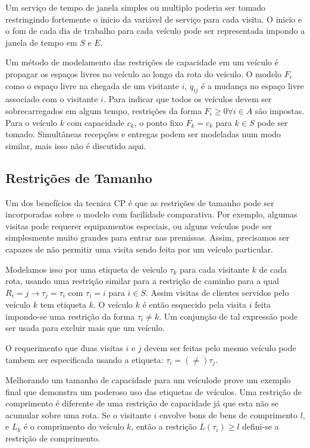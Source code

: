 \documentclass[a4paper, 12pt]{article}
\begin{document}
 Um serviço de tempo de janela simples ou multiplo poderia ser tomado restringindo fortemente o
inicio da variável de serviço para cada visita. O inicio e o fom de cada dia de trabalho para cada
veículo pode ser representada impondo a janela de tempo em $S$ e $E$.

 Um método de modelamento das restrições de capacidade em um veículo é propagar os espaços livres no
veículo ao longo da rota do veículo. O modelo $F_i$ como o espaço livre na chegada de um visitante
$i$, $q_{ij}$ é a mudança no espaço livre associado com o visitante $i$. Para indicar que todos os
veículos devem ser sobrecarregados em algum tempo, restrições da forma $F_i \geq 0 \forall i \in A$
são impostas. Para o veículo $k$ com capacidade $c_k$, o ponto fixo $F_k=c_k$ para $k \in S$ pode
ser tomado. Simultâneas recepções e entregas podem ser modeladas num modo similar, mais isso não é
discutido aqui.

\subsection{Restrições de Tamanho}

 Um dos benefícios da tecnica CP é que as restrições de tamanho pode ser incorporadas sobre o modelo
com facilidade comparativa. Por exemplo, algumas visitas pode requerer equipamentos especiais, ou
alguns veículos pode ser simplesmente muito grandes para entrar nas premissas. Assim, precisamos ser
capazes de não permitir uma visita sendo feita por um veículo particular.

 Modelamos isso por uma etiqueta de veículo $\tau_k$ para cada visitante $k$ de cada rota, usando
uma restrição similar para a restrição de caminho para a qual $R_i = j\rightarrow \tau_j=\tau_i$ com
$\tau_i = i$ para $i\in S$. Assim visitas de clientes servidos pelo veículo $k$ tem etiqueta $k$. O
veículo $k$ é então esquecido pela visita $i$ feita impondo-se uma restrição da forma $\tau_i \neq
k$. Um conjunção de tal expressão pode ser usada para excluir mais que um veículo.

 O requerimento que duas visitas $i$ e $j$ devem ser feitas pelo mesmo veículo pode tambem ser
especificada usando a etiqueta: $\tau_i = (\neq ) \tau_j.$

 Melhorando um tamanho de capacidade para um veículode prove um exemplo final que demonstra um
poderoso uso das etiquetas de veículos. Uma restrição de comprimento é diferente de uma restrição de
capacidade já que esta não se acumular sobre uma rota. Se o visitante $i$ envolve bons de bens de
comprimento $l$, e $L_k$ é o comprimento do veículo $k$, então a restrição $L(\tau_i) \geq l$
defini-se a restrição de comprimento.
\end{document}
